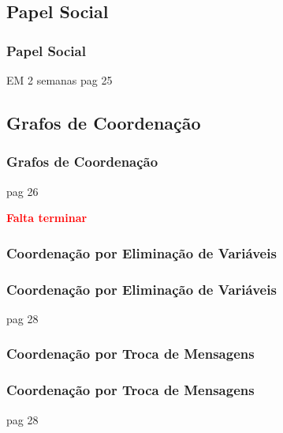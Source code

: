 
\subsection{Papel Social}

\begin{frame}
\frametitle{Papel Social}

EM 2 semanas
pag 25


\end{frame}



\subsection{Grafos de Coordenação}

\begin{frame}
\frametitle{Grafos de Coordenação}

pag 26


\begin{huge}

\textbf{ \textcolor{red}{Falta terminar}}
 

\end{huge}
\end{frame}


\subsubsection{Coordenação por Eliminação de Variáveis}

\begin{frame}
\frametitle{Coordenação por Eliminação de Variáveis}

pag 28


\end{frame}


\subsubsection{Coordenação por Troca de Mensagens}

\begin{frame}
\frametitle{Coordenação por Troca de Mensagens}

pag 28


\end{frame}

